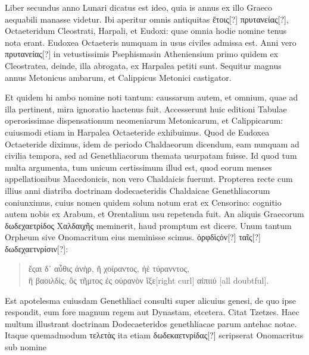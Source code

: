 Liber secundus anno Lunari dicatus est ideo, quia is annus ex illo
Graeco aequabili manasse videtur.
Ibi aperitur omnis antiquitas \textgreek{ἔτοις[?]
πρυτανείας[?]}, Octaeteridum Cleostrati, Harpali, et Eudoxi: quae omnia
hodie nomine tenus nota erant.
Eudoxea Octaeteris numquam
in usus civiles admissa est.
Anni vero \textgreek{πρυτανείας[?]} in vetustissimis Psephismasin
Atheniensium primo quidem ex Cleostratea, deinde, illa
abrogata, ex Harpalea petiti sunt.
{}
Sequitur magnus annus Metonicus
ambarum, et Calippicus Metonici castigator.

Et quidem hi
ambo nomine noti tantum: caussarum autem, et omnium, quae ad
illa pertinent, mira ignoratio hactenus fuit.
Accesserunt huic editioni
Tabulae operosissimae dispensationum neomeniarum Metonicarum,
et Calippicarum: cuiusmodi etiam in Harpalea Octaeteride
exhibuimus. 
Quod de Eudoxea Octaeteride diximus, idem de
periodo Chaldaeorum dicendum, eam nunquam ad civilia tempora,
sed ad Genethliacorum themata usurpatam fuisse.
Id quod tum
multa argumenta, tum unicum certissimum illud est, quod eorum
menses appellationibus Macedonicis, non vero Chaldaicis fuerunt.
Propterea recte cum illius anni diatriba doctrinam dodecaeteridis
Chaldaicae Genethliacorum coniunximus, cuius nomen quidem
solum notum erat ex Censorino: cognitio autem nobis ex Arabum,
et Orentalium usu repetenda fuit.
An aliquis Graecorum \textgreek{δωδεχαετρίδος Χαλδαιχῆς}
meminerit, haud promptum est dicere.
Unum tantum Orpheum sive Onomacritum eius meminisse scimus. 
\textgreek{ὀρφδὶςὀν[?] ταῖς[?] δωδεχαετνρίσιν[?]:}
\begin{quote}
\begin{greek}
ἔςαι δ᾽ αὖθις ἀνὴρ, ἢ χοίραντος, ἠὲ τύρανντος,\\
ἢ βαοιλδὶς, ὂς τῆμτος ἐς οὐρανὸν ἴξε[right curl] αἰπιιύ
 [all doubtful].
\end{greek}
\end{quote}
Est apotelesma cuiusdam Genethliaci consulti super alicuius genesi,
de quo ipse respondit, eum fore magnum regem aut Dynastam, etcetera.
Citat Tzetzes. 
Haec multum illustrant doctrinam Dodecaeteridos
genethliacae parum antehac notae.
Itaque quemadmodum \textgreek{τελετὰς}
ita etiam \textgreek{δωδεκαετνρίδας[?]} scripserat Onomacritus sub nomine
